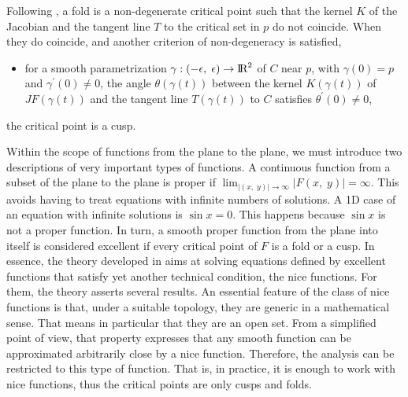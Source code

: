 \documentclass[journal=iecred,manuscript=article]{achemso}
\theoremstyle{definition}
\theoremstyle{remark}
\begin{document}
Following \citet{malta1993}, 
% 
a fold is a non-degenerate critical point such that
%
the kernel $ K $ of the Jacobian and the tangent line $ T $ to the critical set in $ p $ do not coincide. When they do coincide, and another criterion of non-degeneracy is satisfied, 
%
\begin{itemize}
\item for a smooth parametrization $ \gamma : \left( -\epsilon, \; \epsilon \right) \to {\text{I\!R}}^2 $ of $ C $ near $ p $, with $ \gamma \left(0\right) = p $ and $ \gamma^{\prime} \left(0\right) \neq 0 $, the angle $ \theta\left(\gamma\left(t\right)\right) $ between the kernel $ K\left(\gamma\left(t\right)\right) $ of $ JF\left(\gamma\left(t\right)\right) $ and the tangent line $ T\left(\gamma\left(t\right)\right) $ to $ C $ satisfies $ \theta^{\prime}\left(0\right) \neq 0 $,
\end{itemize}
the critical point  is a cusp.

Within the scope of  functions from the plane to the plane, we 
must introduce two descriptions of very important types of 
functions. 
A continuous function from a subset of the plane to the plane 
is proper if  $\lim_{\vert\left(x,\;y\right)\vert\to\infty} \vert F\left(x,\;y\right)\vert = \infty$. This avoids having to treat equations with infinite numbers of solutions. A 1D case of an equation with infinite solutions is $\sin x=0$. This happens because $\sin x$ is not a proper function. 
%
In turn, a smooth proper function from the plane into itself is considered excellent if every critical point of $ F $ is a fold or a cusp. In essence, the theory developed in \citet{malta} aims
at solving equations defined by excellent functions that 
satisfy yet another technical condition, the nice 
functions. For them, the theory 
asserts several results. 
An essential feature of the class of nice functions 
is that, under a suitable topology, they are generic
in a mathematical sense.
That means in particular
that they are an open set. From a simplified point of view, 
that property expresses that any smooth
function can be approximated arbitrarily close by a nice function. 
 Therefore,
the analysis can be restricted to this type of function.
That is, in practice, it is enough to work 
with nice functions, thus the critical points are only 
cusps and folds.
\end{document}
